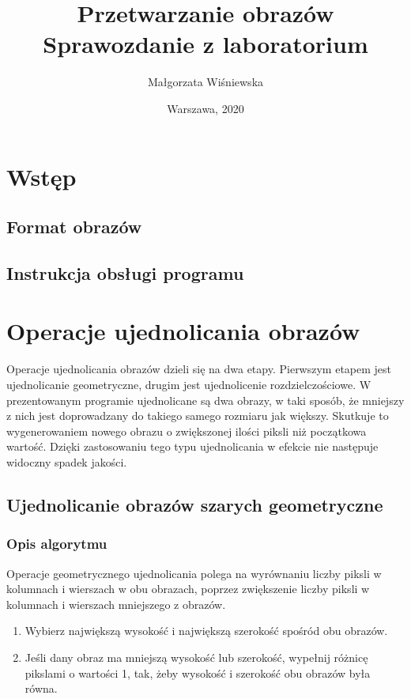 \documentclass[a4paper,12pt, titlepage]{report}
\title{Przetwarzanie obrazów\\Sprawozdanie z laboratorium}
\author{Małgorzata Wiśniewska}
\date{Warszawa, 2020}
\begin{document}
\maketitle
\tableofcontents
\chapter{Wstęp}
\section{Format obrazów}
\section{Instrukcja obsługi programu}

\chapter{Operacje ujednolicania obrazów}
Operacje ujednolicania obrazów dzieli się na dwa etapy. Pierwszym etapem jest ujednolicanie geometryczne, drugim jest ujednolicenie rozdzielczościowe. W prezentowanym programie ujednolicane są dwa obrazy, w taki sposób, że mniejszy z nich jest doprowadzany do takiego samego rozmiaru jak większy. Skutkuje to wygenerowaniem nowego obrazu o zwiększonej ilości piksli niż początkowa wartość. Dzięki zastosowaniu tego typu ujednolicania w efekcie nie następuje widoczny spadek jakości. 
\section{Ujednolicanie obrazów szarych geometryczne}
\subsection*{Opis algorytmu}
\par Operacje geometrycznego ujednolicania polega na wyrównaniu liczby piksli w kolumnach i wierszach w obu obrazach, poprzez zwiększenie liczby piksli w kolumnach i wierszach mniejszego z obrazów.
\begin{enumerate}
\item Wybierz największą wysokość i największą szerokość spośród obu obrazów.
\item Jeśli dany obraz ma mniejszą wysokość lub szerokość, wypełnij różnicę pikslami o wartości 1, tak, żeby wysokość i szerokość obu obrazów była równa.
\end{enumerate}
\end{document}

